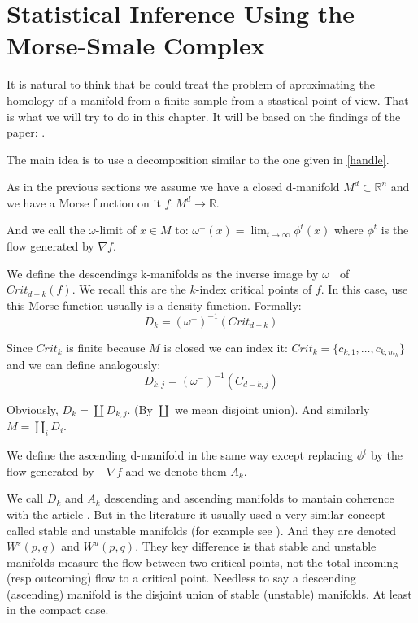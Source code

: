 \chapter{Statistical Inference Using the
Morse-Smale Complex}

It is natural to think that be could treat the problem
of aproximating the homology of a manifold from a finite 
sample from a stastical point of view. 
That is what we will try to do in this chapter. It will be based on the findings of the paper: \cite{che2017}.

The main idea is to use a decomposition similar
to the one given in \ref{handle}.

As in the previous sections we assume we have a closed d-manifold $M^d\subset \mathbb{R}^n$
and we have a Morse function on it $f:M^d\rightarrow \mathbb{R}$.

And we call the $\omega$-limit of $x\in M$ to:
$\omega^-(x)=\displaystyle\lim_{t\to \infty} \phi^t(x)$ where $\phi^t$ is 
the flow generated by $\nabla f$.

We define the descendings k-manifolds as the inverse image by $\omega^-$ of $Crit_{d-k}(f)$. 
We recall this are the $k$-index critical points of $f$.
In this case, use this Morse function usually is a density function.
Formally:
$$
D_k=
(\omega^-)^{-1}(Crit_{d-k})
$$

Since $Crit_k$ is finite because $M$ is closed we can index it:
$Crit_k=\{c_{k,1},\ldots,c_{k,m_k}\}$ and we can define analogously:
$$
D_{k,j}=
(\omega^-)^{-1}(C_{d-k,j})
$$

Obviously, $D_k=\coprod D_{k,j}$. (By $\coprod$ we mean disjoint union). And similarly
$M=\coprod_i D_i$.

We define the ascending d-manifold in the same way except replacing $\phi^t$ by the flow generated by $-\nabla f$
and we denote them $A_k$.

\begin{remark}
We call $D_k$ and $A_k$
descending and ascending manifolds to mantain coherence with the article \cite{che2017}.
But in the literature it usually used a very similar concept called stable and unstable manifolds (for example
see \cite{che2014}).
And they are denoted $W^s(p,q)$ and $W^u(p,q)$.
They key difference is that stable and unstable manifolds measure the flow between two critical points, not the total
incoming (resp outcoming) flow to a critical point. Needless to say a descending (ascending) manifold is the disjoint 
union of stable (unstable) manifolds.
At least in the compact case.
\end{remark}

